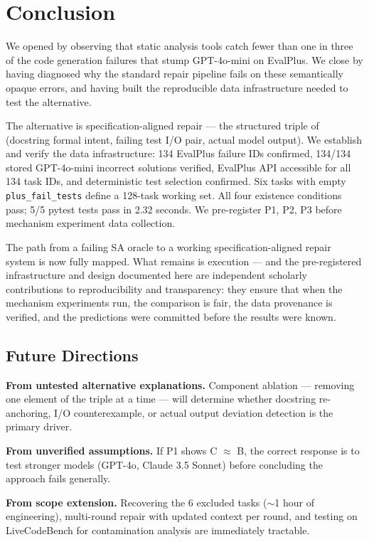 \section{Conclusion}

We opened by observing that static analysis tools catch fewer than one in three of the
code generation failures that stump GPT-4o-mini on EvalPlus. We close by having
diagnosed why the standard repair pipeline fails on these semantically opaque errors,
and having built the reproducible data infrastructure needed to test the alternative.

The alternative is specification-aligned repair --- the structured triple of (docstring
formal intent, failing test I/O pair, actual model output). We establish and verify
the data infrastructure: 134 EvalPlus failure IDs confirmed, 134/134 stored GPT-4o-mini
incorrect solutions verified, EvalPlus API accessible for all 134 task IDs, and
deterministic test selection confirmed. Six tasks with empty \texttt{plus\_fail\_tests} define
a 128-task working set. All four existence conditions pass; 5/5 pytest tests pass in
2.32 seconds. We pre-register P1, P2, P3 before mechanism experiment data collection.

The path from a failing SA oracle to a working specification-aligned repair system is
now fully mapped. What remains is execution --- and the pre-registered infrastructure
and design documented here are independent scholarly contributions to reproducibility
and transparency: they ensure that when the mechanism experiments run, the comparison
is fair, the data provenance is verified, and the predictions were committed before
the results were known.

\subsection*{Future Directions}

\textbf{From untested alternative explanations.} Component ablation --- removing one element
of the triple at a time --- will determine whether docstring re-anchoring, I/O
counterexample, or actual output deviation detection is the primary driver.

\textbf{From unverified assumptions.} If P1 shows C $\approx$ B, the correct response is to test
stronger models (GPT-4o, Claude 3.5 Sonnet) before concluding the approach fails
generally.

\textbf{From scope extension.} Recovering the 6 excluded tasks ($\sim$1 hour of engineering),
multi-round repair with updated context per round, and testing on LiveCodeBench for
contamination analysis are immediately tractable.
